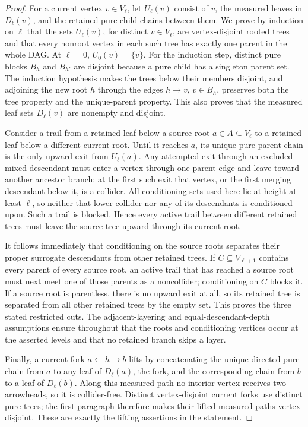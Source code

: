 \documentclass{article}
\begin{document}
\begin{proof}
For a current vertex \(v\in V_\ell\), let \(U_\ell(v)\) consist of \(v\), the measured leaves in \(D_\ell(v)\), and the retained pure-child chains between them.  We prove by induction on \(\ell\) that the sets \(U_\ell(v)\), for distinct \(v\in V_\ell\), are vertex-disjoint rooted trees and that every nonroot vertex in each such tree has exactly one parent in the whole DAG.  At \(\ell=0\), \(U_0(v)=\{v\}\).  For the induction step, distinct pure blocks \(B_h\) and \(B_{h'}\) are disjoint because a pure child has a singleton parent set.  The induction hypothesis makes the trees below their members disjoint, and adjoining the new root \(h\) through the edges \(h\to v\), \(v\in B_h\), preserves both the tree property and the unique-parent property.  This also proves that the measured leaf sets \(D_\ell(v)\) are nonempty and disjoint.

Consider a trail from a retained leaf below a source root \(a\in A\subseteq V_\ell\) to a retained leaf below a different current root.  Until it reaches \(a\), its unique pure-parent chain is the only upward exit from \(U_\ell(a)\).  Any attempted exit through an excluded mixed descendant must enter a vertex through one parent edge and leave toward another ancestor branch; at the first such exit that vertex, or the first merging descendant below it, is a collider.  All conditioning sets used here lie at height at least \(\ell\), so neither that lower collider nor any of its descendants is conditioned upon.  Such a trail is blocked.  Hence every active trail between different retained trees must leave the source tree upward through its current root.

It follows immediately that conditioning on the source roots separates their proper surrogate descendants from other retained trees.  If \(C\subseteq V_{\ell+1}\) contains every parent of every source root, an active trail that has reached a source root must next meet one of those parents as a noncollider; conditioning on \(C\) blocks it.  If a source root is parentless, there is no upward exit at all, so its retained tree is separated from all other retained trees by the empty set.  This proves the three stated restricted cuts.  The adjacent-layering and equal-descendant-depth assumptions ensure throughout that the roots and conditioning vertices occur at the asserted levels and that no retained branch skips a layer.

Finally, a current fork \(a\leftarrow h\to b\) lifts by concatenating the unique directed pure chain from \(a\) to any leaf of \(D_\ell(a)\), the fork, and the corresponding chain from \(b\) to a leaf of \(D_\ell(b)\).  Along this measured path no interior vertex receives two arrowheads, so it is collider-free.  Distinct vertex-disjoint current forks use distinct pure trees; the first paragraph therefore makes their lifted measured paths vertex-disjoint.  These are exactly the lifting assertions in the statement.
\end{proof}
\end{document}

